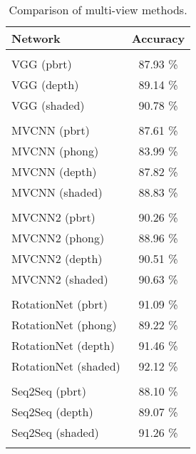\begin{table}[]
	\centering
	\begin{tabular}{lc}
		\hline
		\textbf{Network}     & Accuracy \\ \hline
		                     &          \\
		VGG (pbrt)           & 87.93 \% \\
		VGG (depth)          & 89.14 \% \\
		VGG (shaded)         & 90.78 \% \\
		                     &          \\
		MVCNN (pbrt)         & 87.61 \% \\
		MVCNN (phong)        & 83.99 \% \\
		MVCNN (depth)        & 87.82 \% \\
		MVCNN (shaded)       & 88.83 \% \\
		                     &          \\
		MVCNN2 (pbrt)        & 90.26 \% \\
		MVCNN2 (phong)       & 88.96 \%  \\
		MVCNN2 (depth)       & 90.51 \% \\
		MVCNN2 (shaded)      & 90.63 \% \\
		                     &          \\
		RotationNet (pbrt)   & 91.09 \% \\
		RotationNet (phong)  & 89.22 \% \\
		RotationNet (depth)  & 91.46 \% \\
		RotationNet (shaded) & 92.12 \%  \\
		                     &          \\
		Seq2Seq  (pbrt)      & 88.10 \% \\
		Seq2Seq  (depth)     & 89.07 \% \\
		Seq2Seq  (shaded)    & 91.26 \% \\
		                     &          \\ \hline
	\end{tabular}
\caption{Comparison of multi-view methods.}
\label{Table:mv}
\end{table}